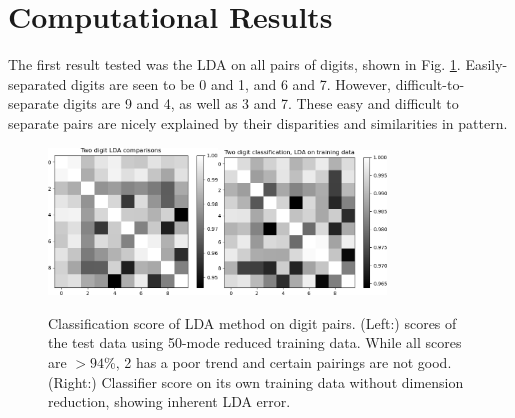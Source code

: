 \documentclass{article}
\begin{document}
\section{Computational Results}
The first result tested was the LDA on all pairs of digits, shown in Fig. \ref{lda}. Easily-separated digits are seen to be 0 and 1, and 6 and 7. However, difficult-to-separate digits are 9 and 4, as well as 3 and 7. These easy and difficult to separate pairs are nicely explained by their disparities and similarities in pattern.

\begin{figure}[hb!]
  \centering
  \includegraphics[width=0.4\textwidth]{2dgt_error_lda_50modes}\quad\quad\quad\includegraphics[width=0.4\textwidth]{ontrainingdata/lda_allmodes}
  \caption{Classification score of LDA method on digit pairs. (Left:) scores of the test data using 50-mode reduced training data. While all scores are $>94$\%, 2 has a poor trend and certain pairings are not good.\\(Right:) Classifier score on its own training data without dimension reduction, showing inherent LDA error.}\label{lda}
\end{figure}
\end{document}
